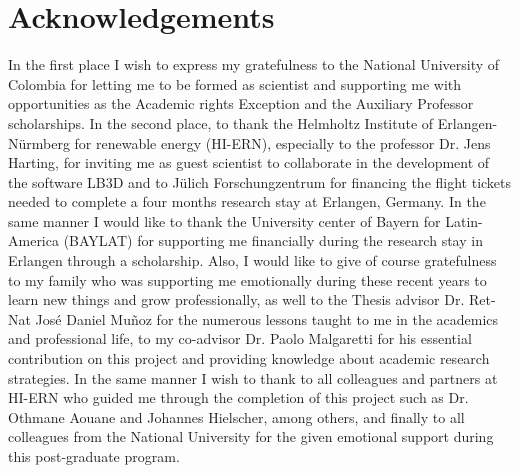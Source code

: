 
\chapter*{Acknowledgements}

In the first place I wish to express my gratefulness to the National University of Colombia for letting me to be formed as scientist and supporting me with opportunities as the Academic rights Exception and the Auxiliary Professor scholarships. In the second place, to thank the Helmholtz Institute of Erlangen-Nürmberg for renewable energy (HI-ERN), especially to the professor Dr. Jens Harting, for inviting me as guest scientist to collaborate in the development of the software LB3D and to Jülich Forschungzentrum for financing the flight tickets needed to complete a four months research stay at Erlangen, Germany. In the same manner I would  like to thank the University center of Bayern for Latin-America (BAYLAT) for supporting me financially during the research stay in Erlangen through a scholarship. Also, I would like to give of course gratefulness to my family who was supporting me emotionally during these recent years to learn new things and grow professionally, as well to the Thesis advisor Dr. Ret-Nat Jos\'{e} Daniel Mu\~{n}oz for the numerous lessons taught to me in the academics and professional life, to my co-advisor Dr. Paolo Malgaretti for his essential contribution on this project and providing knowledge about academic research strategies. In the same manner I wish to thank to all colleagues and partners at HI-ERN who guided me through the completion of this project such as Dr. Othmane Aouane and Johannes Hielscher, among others, and finally to all colleagues from the National University for the given emotional support during this post-graduate program. \\

